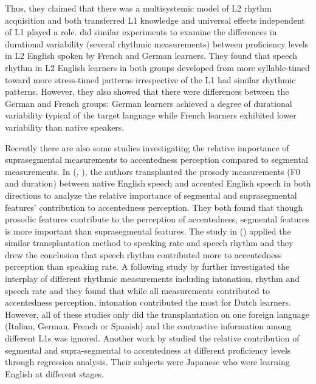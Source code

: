 Thus, they claimed that there was a multisystemic model of L2 rhythm acquisition and both transferred L1 knowledge and universal effects independent of L1 played a role. \cite{ordin2015acquisition} did similar experiments to examine the differences in durational variability (several rhythmic measurements) between proficiency levels in L2 English spoken by French and German learners. They found that speech rhythm in L2 English learners in both groups developed from more syllable-timed toward more stress-timed patterns irrespective of the L1 had similar rhythmic patterns. However, they also showed that there were differences between the German and French groups: German learners achieved a degree of durational variability typical of the target language while French learners exhibited lower variability than native speakers.

Recently there are also some studies investigating the relative importance of suprasegmental measurements to accentedness perception compared to segmental measurements. In (\cite{rognoni2013testing}, \cite{winters2013perceived}), the authors transplanted the prosody measurements (F0 and duration) between native English speech and accented English speech in both directions to analyze the relative importance of segmental and suprasegmental features' contribution to accentedness perception. They both found that though prosodic features contribute to the perception of accentedness, segmental features is more important than suprasegmental features. The study in (\cite{polyanskaya2016relative}) applied the similar transplantation method to speaking rate and speech rhythm and they drew the conclusion that speech rhythm contributed more to accentedness perception than speaking rate. A following study by \cite{van2017l1} further investigated the interplay of different rhythmic measurements including intonation, rhythm and speech rate and they found that while all measurements contributed to accentedness perception, intonation contributed the most for Dutch learners. However, all of these studies only did the transplantation on one foreign language (Italian, German, French or Spanish) and the contrastive information among different L1s was ignored. Another work by \cite{saito2016second} studied the relative contribution of segmental and supra-segmental to accentedness at different proficiency levels through regression analysis. Their subjects were Japanese who were learning English at different stages.

